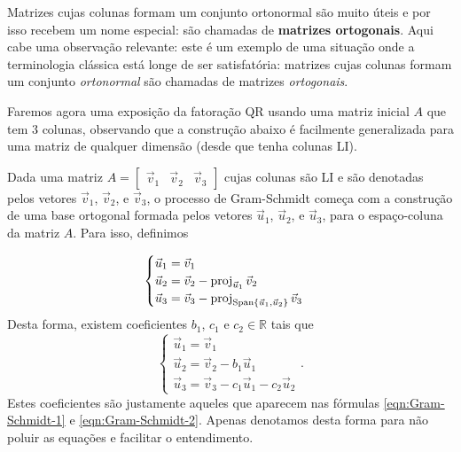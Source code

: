 \documentclass[../livro.tex]{subfiles}  %
\begin{document}
Matrizes cujas colunas formam um conjunto ortonormal são muito úteis e por isso recebem um nome especial: são chamadas de \textbf{matrizes ortogonais}. Aqui cabe uma observação relevante: este é um exemplo de uma situação onde a terminologia clássica está longe de ser satisfatória: matrizes  cujas colunas formam um conjunto {\it ortonormal} são chamadas de matrizes {\it ortogonais}.   

\medskip

Faremos agora uma exposição da fatoração QR usando uma matriz inicial $A$ que tem 3 colunas, observando que a construção abaixo é facilmente generalizada para uma matriz de qualquer dimensão (desde que tenha colunas LI).

Dada uma matriz $A=\begin{bmatrix}
\vec{v}_1 & \vec{v}_2 & \vec{v}_3
\end{bmatrix}$ cujas colunas são LI e são denotadas pelos vetores $\vec{v}_1$, $\vec{v}_2$, e $\vec{v}_3$, 
o processo de Gram-Schmidt começa com a construção de uma base ortogonal formada pelos vetores
$\vec{u}_1$, $\vec{u}_2$, e $\vec{u}_3$,
para o espaço-coluna da matriz $A$. Para isso, definimos

\begin{equation}
\begin{cases}
\vec{u}_1 = \vec{v}_1 \\ 
\vec{u}_2 = \vec{v}_2 - \operatorname{proj}_{\vec{u}_1} \vec{v}_2 \\
\vec{u}_3 = \vec{v}_3 - \operatorname{proj}_{\operatorname{Span}\{\vec{u}_1,\vec{u}_2\}} \vec{v}_3
\end{cases}
\end{equation}
Desta forma, existem coeficientes $b_1$, $c_1$ e $c_2 \in \mathbb{R}$ tais que
\begin{equation}
\begin{cases}
\vec{u}_1 = \vec{v}_1 \\ 
\vec{u}_2 = \vec{v}_2 - b_1 \vec{u}_1 \\
\vec{u}_3 = \vec{v}_3 - c_1 \vec{u}_1 - c_2 \vec{u}_2
\end{cases}.
\end{equation} Estes coeficientes são justamente aqueles que aparecem nas fórmulas \eqref{eqn:Gram-Schmidt-1} e \eqref{eqn:Gram-Schmidt-2}. Apenas denotamos desta forma para não poluir as equações e facilitar o entendimento.
\end{document}
